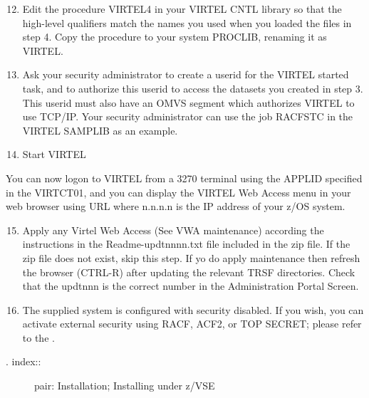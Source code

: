 \documentclass[letterpaper,10pt,english]{sphinxmanual}
\begin{document}
\begin{sphinxVerbatim}[commandchars=\\\{\}]
 
\end{sphinxVerbatim}
\begin{enumerate}
\setcounter{enumi}{11}
\item {} 
Edit the procedure VIRTEL4 in your VIRTEL CNTL library so that the high-level qualifiers match the names you used when you loaded the files in step 4. Copy the procedure to your system PROCLIB, renaming it as VIRTEL.

\item {} 
Ask your security administrator to create a userid for the VIRTEL started task, and to authorize this userid to access the datasets you created in step 3. This userid must also have an OMVS segment which authorizes VIRTEL to use TCP/IP. Your security administrator can use the job RACFSTC in the VIRTEL SAMPLIB as an example.

\item {} 
Start VIRTEL

\end{enumerate}

You can now logon to VIRTEL from a 3270 terminal using the APPLID specified in the VIRTCT01, and you can display the VIRTEL Web Access menu in your web browser using URL  where n.n.n.n is the IP address of your z/OS system.
\begin{enumerate}
\setcounter{enumi}{14}
\item {} 
Apply any Virtel Web Access (See VWA maintenance) according the instructions in the Readme-updtnnnn.txt file included in the zip file. If the zip file does not exist, skip this step. If yo do apply maintenance then refresh the browser (CTRL-R) after updating the relevant TRSF directories. Check that the updtnnn is the correct number in the Administration Portal Screen.

\item {} 
The supplied system is configured with security disabled. If you wish, you can activate external security using RACF, ACF2, or TOP SECRET; please refer to the {\hyperref[\detokenize{Installation_Guide:v457ig-security}]{}}.

\end{enumerate}
\begin{description}
\item[{. index::}] \leavevmode
pair: Installation; Installing under z/VSE

\end{description}
\end{document}
